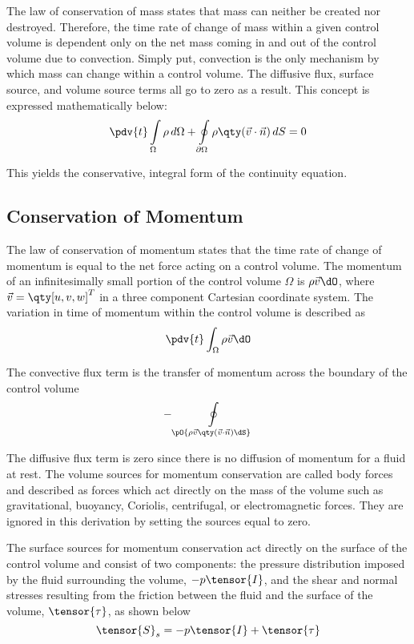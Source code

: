 The law of conservation of mass states that mass can neither be created nor destroyed. Therefore, the time rate of change of mass within a given control volume is dependent only on the net mass coming in and out of the control volume due to convection. Simply put, convection is the only mechanism by which mass can change within a control volume. The diffusive flux, surface source, and volume source terms all go to zero as a result. This concept is expressed mathematically below:
%
\begin{equation} \pdv{t} \int\limits_{\Omega}{\rho \, d\Omega} + \oint\limits_{\partial \Omega}{\rho\qty(\vec{v}\cdot\vec{n})\,dS} = 0 \label{eq:mass} \end{equation}

\noindent
This yields the conservative, integral form of the continuity equation.

\subsection{Conservation of Momentum}

The law of conservation of momentum states that the time rate of change of momentum is equal to the net force acting on a control volume. The momentum of an infinitesimally small portion of the control volume $\Omega$ is $\rho \vec{v}\dO$, where $\vec{v} = \qty[u,v,w]^T$ in a three component Cartesian coordinate system. The variation in time of momentum within the control volume is described as
%
$$ \pdv{t}\int_\Omega{\rho\vec{v}\dO} $$

The convective flux term is the transfer of momentum across the boundary of the control volume
%
$$ -\oint\limits_\pO{\rho\vec{v}\qty(\vec{v}\cdot\vec{n})\dS} $$

The diffusive flux term is zero since there is no diffusion of momentum for a fluid at rest.
The volume sources for momentum conservation are called body forces and described as forces which act directly on the mass of the volume such as gravitational, buoyancy, Coriolis, centrifugal, or electromagnetic forces. They are ignored in this derivation by setting the sources equal to zero.

The surface sources for momentum conservation act directly on the surface of the control volume and consist of two components: the pressure distribution imposed by the fluid surrounding the volume, $-p\tensor{I}$, and the shear and normal stresses resulting from the friction between the fluid and the surface of the volume, $\tensor{\tau}$, as shown below
%
$$ \tensor{S}_s = -p\tensor{I} + \tensor{\tau} $$

